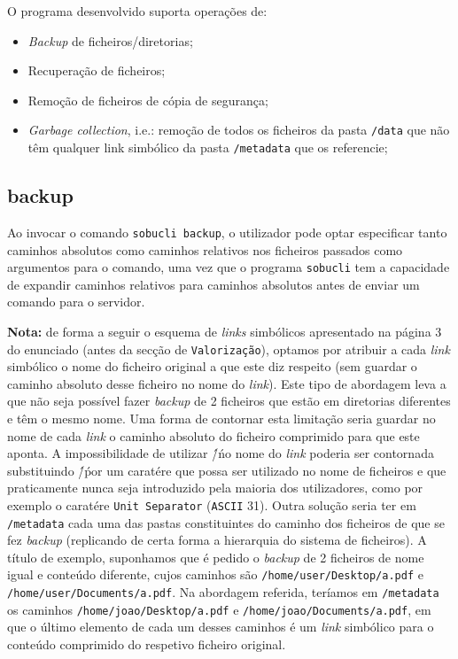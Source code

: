 \documentclass[a4paper,12pt,titlepage,portuguese]{article}
\begin{document}
O programa desenvolvido suporta operações de:

	\begin{itemize}
		\item \emph{Backup} de ficheiros/diretorias;
		\item Recuperação de ficheiros;
		\item Remoção de ficheiros de cópia de segurança;
		\item \emph{Garbage collection}, i.e.: remoção de todos os ficheiros da pasta \texttt{/data} que não têm qualquer link simbólico da pasta \texttt{/metadata} que os referencie;
	\end{itemize}

\subsection{backup}

Ao invocar o comando \texttt{sobucli backup}, o utilizador pode optar especificar tanto caminhos absolutos como caminhos relativos nos ficheiros passados como argumentos para o comando, uma vez que o programa \texttt{sobucli} tem a capacidade de expandir caminhos relativos para caminhos absolutos antes de enviar um comando para o servidor.

\textbf{Nota:} de forma a seguir o esquema de \emph{links} simbólicos apresentado na página 3 do enunciado (antes da secção de \texttt{Valorização}), optamos por atribuir a cada \emph{link} simbólico o nome do ficheiro original a que este diz respeito (sem guardar o caminho absoluto desse ficheiro no nome do \emph{link}). Este tipo de abordagem leva a que não seja possível fazer \emph{backup} de 2 ficheiros que estão em diretorias diferentes e têm o mesmo nome. Uma forma de contornar esta limitação seria guardar no nome de cada \emph{link} o caminho absoluto do ficheiro comprimido para que este aponta. A impossibilidade de utilizar \'/\' no nome do \emph{link} poderia ser contornada substituindo \'/\' por um caratére que possa ser utilizado no nome de ficheiros e que praticamente nunca seja introduzido pela maioria dos utilizadores, como por exemplo o caratére \texttt{Unit Separator} (\texttt{ASCII} 31). Outra solução seria ter em \texttt{/metadata} cada uma das pastas constituintes do caminho dos ficheiros de que se fez \emph{backup} (replicando de certa forma a hierarquia do sistema de ficheiros). A título de exemplo, suponhamos que é pedido o \emph{backup} de 2 ficheiros de nome igual e conteúdo diferente, cujos caminhos são \texttt{/home/user/Desktop/a.pdf} e \texttt{/home/user/Documents/a.pdf}. Na abordagem referida, teríamos em \texttt{/metadata} os caminhos \texttt{/home/joao/Desktop/a.pdf} e \texttt{/home/joao/Documents/a.pdf}, em que o último elemento de cada um desses caminhos é um \emph{link} simbólico para o conteúdo comprimido do respetivo ficheiro original.
\end{document}
